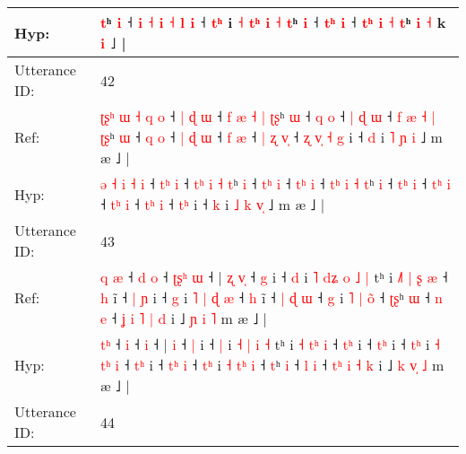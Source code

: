 \documentclass[10pt]{article}
\DeclareRobustCommand{\hl}[1]{{\textcolor{red}{#1}}}
\begin{document}
\begin{longtable}{ll}
 \\
Hyp: & \hl{}\hl{t}ʰ \hl{i} ˧ \hl{}\hl{i} \hl{˧} \hl{i} \hl{˧} \hl{l} \hl{i} ˧ \hl{t}\hl{ʰ} i \hl{˧} \hl{}\hl{t}\hl{ʰ} \hl{i} \hl{˧} \hl{}\hl{t}ʰ \hl{i} ˧ \hl{t}\hl{ʰ} \hl{i} ˧ \hl{t}\hl{ʰ}\hl{ }\hl{i} \hl{˧} \hl{t}ʰ \hl{i} \hl{˧} k\hl{} \hl{i} ˩ |
 \\
\midrule
Utterance ID: & 42 \\
Ref: & \hl{ʈ}\hl{ʂ}\hl{ʰ} \hl{ɯ} \hl{˧} \hl{q} \hl{o} ˧ \hl{|}\hl{ }\hl{ɖ} \hl{ɯ} ˧ \hl{f}\hl{ }\hl{æ} \hl{˧} \hl{|} \hl{ʈ}\hl{ʂ}ʰ \hl{ɯ} ˧ \hl{}\hl{q} \hl{o} ˧ \hl{|}\hl{ }\hl{ɖ} \hl{ɯ} ˧ \hl{f}\hl{ }\hl{æ} \hl{˧} \hl{|} \hl{ʈ}\hl{ʂ}ʰ \hl{ɯ} ˧ \hl{}\hl{q} \hl{o} ˧ \hl{|}\hl{ }\hl{ɖ} \hl{ɯ} ˧ \hl{}\hl{f} \hl{æ} ˧ \hl{|}\hl{ }\hl{ʐ} \hl{v}\hl{̩} ˧\hl{ }\hl{ʐ}\hl{ }\hl{v}\hl{̩} \hl{˧}\hl{ }\hl{g} i ˧ \hl{d} i \hl{˥} \hl{ɲ} \hl{}\hl{i} ˩ m æ ˩ |
 \\
Hyp: & \hl{}\hl{}\hl{ə} \hl{˧} \hl{i} \hl{˧} \hl{i} ˧ \hl{}\hl{t}\hl{ʰ} \hl{i} ˧ \hl{}\hl{t}\hl{ʰ} \hl{i} \hl{˧} \hl{}\hl{t}ʰ \hl{i} ˧ \hl{t}\hl{ʰ} \hl{i} ˧ \hl{}\hl{t}\hl{ʰ} \hl{i} ˧ \hl{}\hl{t}\hl{ʰ} \hl{i} \hl{˧} \hl{}\hl{t}ʰ \hl{i} ˧ \hl{t}\hl{ʰ} \hl{i} ˧ \hl{}\hl{t}\hl{ʰ} \hl{i} ˧ \hl{t}\hl{ʰ} \hl{i} ˧ \hl{}\hl{t}\hl{ʰ} \hl{}\hl{i} ˧\hl{}\hl{}\hl{}\hl{}\hl{} \hl{}\hl{t}\hl{ʰ} i ˧ \hl{k} i \hl{˩} \hl{k} \hl{v}\hl{̩} ˩ m æ ˩ |
 \\
\midrule
Utterance ID: & 43 \\
Ref: & \hl{q}\hl{ }\hl{æ} ˧\hl{ }\hl{d} \hl{o} ˧\hl{ }\hl{ʈ}\hl{ʂ}\hl{ʰ} \hl{ɯ} ˧ |\hl{ }\hl{ʐ} \hl{v}\hl{̩} ˧ \hl{g} i ˧ \hl{d} i\hl{ }\hl{˥} \hl{d}\hl{ʑ} \hl{o} \hl{˩} \hl{|} tʰ i \hl{˩}\hl{˥} \hl{|}\hl{ }\hl{ʂ} \hl{æ} ˧ \hl{}\hl{h} i\hl{̃} ˧ \hl{|}\hl{ }\hl{ɲ} i ˧ \hl{}\hl{g} i \hl{˥} \hl{|}\hl{ }\hl{ɖ} \hl{æ} ˧ \hl{}\hl{h} i\hl{̃} ˧ \hl{|}\hl{ }\hl{ɖ} \hl{ɯ} ˧ \hl{}\hl{g} i \hl{˥} \hl{|}\hl{ }\hl{o}\hl{̃} ˧ \hl{ʈ}\hl{ʂ}ʰ \hl{ɯ} ˧ \hl{n} \hl{e} ˧ \hl{ʝ}\hl{ }\hl{i} \hl{˥} \hl{|} \hl{d} i ˩ \hl{ɲ} \hl{}\hl{i} \hl{˥} m æ ˩ |
 \\
Hyp: & \hl{}\hl{t}\hl{ʰ} ˧\hl{}\hl{} \hl{i} ˧\hl{}\hl{}\hl{}\hl{} \hl{i} ˧ |\hl{}\hl{} \hl{}\hl{i} ˧ \hl{|} i ˧ \hl{|} i\hl{}\hl{} \hl{}\hl{˧} \hl{|} \hl{i} \hl{˧} tʰ i \hl{}\hl{˧} \hl{}\hl{t}\hl{ʰ} \hl{i} ˧ \hl{t}\hl{ʰ} i\hl{} ˧ \hl{}\hl{t}\hl{ʰ} i ˧ \hl{t}\hl{ʰ} i \hl{˧} \hl{}\hl{t}\hl{ʰ} \hl{i} ˧ \hl{t}\hl{ʰ} i\hl{} ˧ \hl{}\hl{t}\hl{ʰ} \hl{i} ˧ \hl{t}\hl{ʰ} i \hl{˧} \hl{t}\hl{ʰ}\hl{ }\hl{i} ˧ \hl{}\hl{t}ʰ \hl{i} ˧ \hl{l} \hl{i} ˧ \hl{}\hl{t}\hl{ʰ} \hl{i} \hl{˧} \hl{k} i ˩ \hl{k} \hl{v}\hl{̩} \hl{˩} m æ ˩ |
 \\
\midrule
Utterance ID: & 44 \\

\end{longtable}
\end{document}
